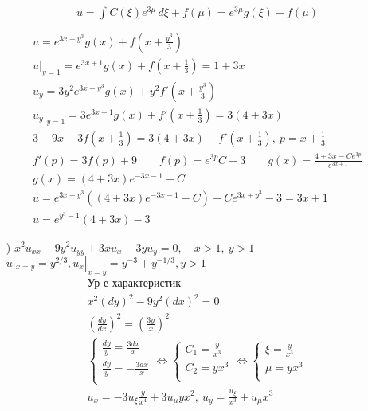 \begin{enumerate}
\begin{gather*}
  u=\int_{}^{} C(\xi)e^{3\mu} \,d\xi+f(\mu)=e^{3\mu}g(\xi)+f(\mu) \\
\end{gather*}
  \begin{gather*}
  u=e^{3x+y^{3}}g(x)+f(x+ \frac{y^{3}}{3}) \\
  u|_{y=1} = e^{3x+1}g(x)+f(x+ \frac{1}{3})=1+3x\\
  u_{y}=3y^{2}e^{3x+y^{3}}g(x)+y^{2}f'(x+ \frac{y^{3}}{3}) \\
  u_{y}|_{y=1}=3e^{3x+1}g(x)+f'(x+ \frac{1}{3}) = 3(4+3x)\\
  3+9x-3f(x + \frac{1}{3}) = 3(4+3x)-f'(x+ \frac{1}{3}), \ p = x + \frac{1}{3} \\
  f '(p)=3f(p)+9 \qquad f(p)=e^{3p}C-3 \qquad g(x) = \frac{4+3x-Ce^{3p}}{e^{3x+1}} \\
  g(x) = (4+3x)e^{-3x-1}-C \\
  u=e^{3x+y^{3}}((4+3x)e^{-3x-1}-C)+Ce^{3x+y^{3}}-3=3x+1 \\
  \boxed{u=e^{y^{3}-1}(4+3x)-3}
  \end{gather*}
\item[\text{б})] $x^{2}u_{xx}-9y^{2}u_{yy}+3xu_{x}-3yu_{y}=0, \quad x>1, \ y>1$ \\
  $u|_{x=y}=y^{2 / 3},u_{x}|_{x=y}=y^{-3}+y^{-1 /3}, y>1$ \\
  \begin{gather*}
    \text{Ур-е характеристик} \\
    x^{2}(dy)^{2}-9y^{2}(dx)^{2}=0 \\
    (\frac{dy}{dx})^{2}=( \frac{3y}{x})^{2} \\
    \begin{cases}
     \frac{dy}{y}= \frac{3dx}{x} \\ \frac{dy}{y}= -\frac{3dx}{x} \\
    \end{cases} \Leftrightarrow 
    \begin{cases}
     C_{1} = \frac{y}{x^{3}} \\ C_{2}= yx^{3} \\ 
    \end{cases} \Leftrightarrow 
    \begin{cases}
    \xi = \frac{y}{x^{3}} \\ \mu= yx^{3} \\ 
    \end{cases} \\
    u_{x} = -3u_{\xi} \frac{y}{x^{4}} + 3u_{\mu}yx^{2}, \ u_{y}= \frac{u_{\xi}}{x^{3}} + u_{\mu}x^{3} \\

\end{gather*}
\end{enumerate}
